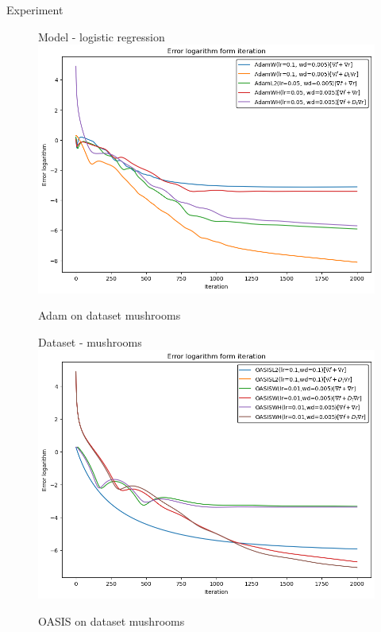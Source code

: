 \documentclass[aspectratio=169, 12pt]{beamer}
\begin{document}
\begin{frame}{Experiment}
    \begin{figure}[H]
\begin{minipage}[h]{0.49\linewidth}
\centering Model - logistic regression
\includegraphics[width=\textwidth]{adams_error.png}
\caption{Adam on dataset mushrooms}
    \label{fig:adams_error}
\end{minipage}
\hfill
\begin{minipage}[h]{0.49\linewidth}
\centering Dataset - mushrooms
\includegraphics[width=\textwidth]{oasis_error.png}
    \caption{OASIS on dataset mushrooms}
        \label{fig:oasis_error}
\end{minipage}
\label{fig:oasis_error}
\end{figure}
\end{frame}
\end{document}
